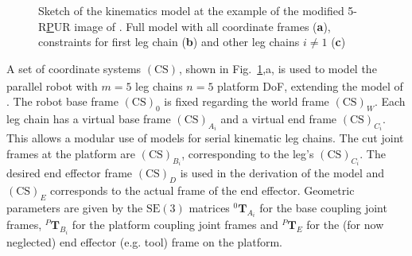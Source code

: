 \documentclass[
	graybox,
	vecphys] %
	{svmult}
\newcommand{\ks}[1]{{(\mathrm{CS})}_{#1}}
\newcommand{\trmat}[2]{{{ }^{#1}\boldsymbol{T}}_{#2}}
\begin{document}
\begin{figure}[tb]

\caption{Sketch of the kinematics model at the example of the modified 5-R\underline{P}UR image of \cite{MasoulehGos2011}. Full model with all coordinate frames (\textbf{a}), constraints for first leg chain (\textbf{b}) and other leg chains $i{\ne}1$ (\textbf{c})}
\label{fig:kinematic_sketch}
\end{figure}

A set of coordinate systems $\ks{}$, shown in Fig.~\ref{fig:kinematic_sketch},a, is used to model the parallel robot with $m{=}5$ leg chains $n{=}5$ platform DoF, extending the model of \cite{BriotKha2015}.
The robot base frame $\ks{0}$ is fixed regarding the world frame $\ks{W}$.
Each leg chain has a virtual base frame $\ks{A_i}$ and a virtual end frame $\ks{C_i}$.
This allows a modular use of models for serial kinematic leg chains.
The cut joint frames at the platform are $\ks{B_i}$, corresponding to the leg's $\ks{C_i}$.
The desired end effector frame $\ks{D}$ is used in the derivation of the model and $\ks{E}$ corresponds to the actual frame of the end effector.
Geometric parameters are given by the $\mathrm{SE}(3)$ matrices $\trmat{0}{A_i}$ for the base coupling joint frames, $\trmat{P}{B_i}$ for the platform coupling joint frames and $\trmat{P}{E}$ for the (for now neglected) end effector (e.g. tool) frame on the platform.
\end{document}
